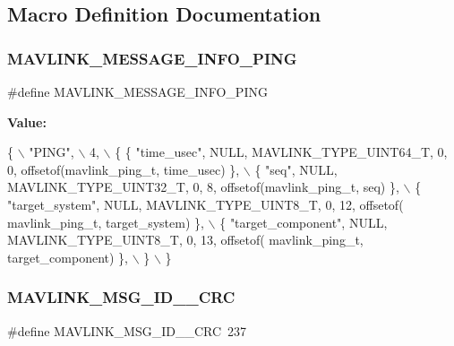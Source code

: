 \subsection{Macro Definition Documentation}
\mbox{\label{mavlink__msg__ping_8h_a66431f766b127ce380aa63696cb8aeba}} 
\subsubsection{M\+A\+V\+L\+I\+N\+K\+\_\+\+M\+E\+S\+S\+A\+G\+E\+\_\+\+I\+N\+F\+O\+\_\+\+P\+I\+NG}
{\footnotesize\ttfamily \#define M\+A\+V\+L\+I\+N\+K\+\_\+\+M\+E\+S\+S\+A\+G\+E\+\_\+\+I\+N\+F\+O\+\_\+\+P\+I\+NG}

{\bfseries Value\+:}
\begin{DoxyCode}
\{ \(\backslash\)
    \textcolor{stringliteral}{"PING"}, \(\backslash\)
    4, \(\backslash\)
    \{  \{ \textcolor{stringliteral}{"time\_usec"}, NULL, MAVLINK_TYPE_UINT64_T, 0, 0, offsetof(mavlink_ping_t, time\_usec) \}, \(\backslash\)
         \{ \textcolor{stringliteral}{"seq"}, NULL, MAVLINK_TYPE_UINT32_T, 0, 8, offsetof(mavlink_ping_t, seq) \}, \(\backslash\)
         \{ \textcolor{stringliteral}{"target\_system"}, NULL, MAVLINK_TYPE_UINT8_T, 0, 12, offsetof(
      mavlink_ping_t, target\_system) \}, \(\backslash\)
         \{ \textcolor{stringliteral}{"target\_component"}, NULL, MAVLINK_TYPE_UINT8_T, 0, 13, offsetof(
      mavlink_ping_t, target\_component) \}, \(\backslash\)
         \} \(\backslash\)
\}
\end{DoxyCode}
\mbox{\label{mavlink__msg__ping_8h_a0eca7235582b52064d33ca16e3db4e94}} 
\subsubsection{M\+A\+V\+L\+I\+N\+K\+\_\+\+M\+S\+G\+\_\+\+I\+D\+\_\+\_\+\+C\+RC}
{\footnotesize\ttfamily \#define M\+A\+V\+L\+I\+N\+K\+\_\+\+M\+S\+G\+\_\+\+I\+D\+\_\+\_\+\+C\+RC~237}


